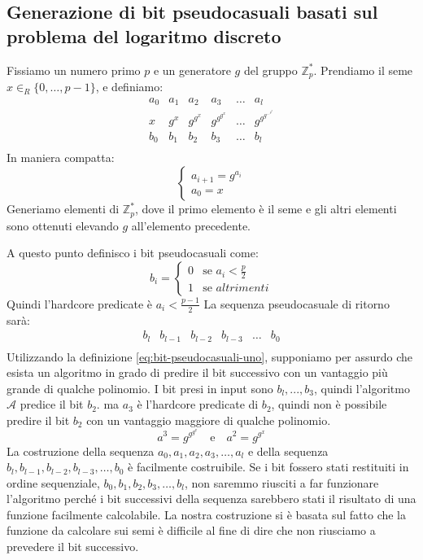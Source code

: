 \subsection{Generazione di bit pseudocasuali basati sul problema del logaritmo discreto} \label{subs:generazione-bit-pseudocasuali}
Fissiamo un numero primo $p$ e un generatore $g$ del gruppo $\mathbb{Z}_p^*$.
Prendiamo il seme $x \in_R \{0,\dots,p-1\}$, e definiamo:
\[
\begin{array}{llllll}
  a_0 & a_1 & a_2 & a_3 & \dots & a_l \\
  x & g^x & g^{g^x} & g^{g^{g^x}} & \dots & g^{g^{g^{\dots^{g^x}}}} \\
  b_0 & b_1 & b_2 & b_3 & \dots & b_l \\
\end{array}
\]
In maniera compatta:
\[
  \begin{cases}
    a_{i + 1} = g^{a_i} \\
    a_0 = x
  \end{cases}
\]
Generiamo elementi di $\mathbb{Z}_p^*$, dove il primo elemento è il seme 
e gli altri elementi sono ottenuti elevando $g$ all'elemento precedente.

A questo punto definisco i bit pseudocasuali come:
\[
  b_i = \begin{cases}
    0 & \text{se } a_i < \frac{p}{2} \\
    1 & \text{se } altrimenti
    \end{cases}
\]
Quindi l'hardcore predicate è $a_i < \frac{p - 1}{2}$
La sequenza pseudocasuale di ritorno sarà:
\[
\begin{array}{llllll}
  b_l & b_{l-1} & b_{l-2} & b_{l-3} & \dots & b_0 \\
\end{array}
\]
Utilizzando la definizione \ref{eq:bit-pseudocasuali-uno}, supponiamo per assurdo che esista 
un algoritmo in grado di predire il bit successivo con un vantaggio più grande 
di qualche polinomio.
I bit presi in input sono $b_l, ..., b_3$, quindi l'algoritmo $\mathcal{A}$ predice il 
bit $b_2$. ma $a_3$ è l'hardcore predicate di $b_2$, quindi non è possibile 
predire il bit $b_2$ con un vantaggio maggiore di qualche polinomio.
\[
  a^3 = g^{g^{g^x}} \quad \text{e} \quad a^2 = g^{g^x}
\]
La costruzione della sequenza 
$a_0, a_1, a_2, a_3, \dots, a_l$ e della sequenza $b_l, b_{l-1}, b_{l-2}, b_{l-3}, \dots, b_0$
è facilmente costruibile. Se i bit fossero stati restituiti in ordine sequenziale, 
$b_0, b_1, b_2, b_3, \dots, b_l$, non saremmo riusciti a far funzionare 
l'algoritmo perché i bit successivi della 
sequenza sarebbero stati il risultato di una funzione facilmente calcolabile.
La nostra costruzione si è basata sul fatto che la funzione da calcolare
sui semi è difficile al fine di dire che non riusciamo a prevedere il bit successivo.

